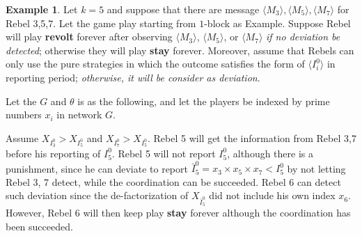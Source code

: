 \documentclass[12pt,letter]{article}
\theoremstyle{definition}
\newtheorem{example}{Example}[section]
\theoremstyle{remark}
\theoremstyle{claim}
\begin{document}
\begin{example}\label{ex_deviation}
Let $k=5$ and suppose that there are message $\langle M_3 \rangle,\langle M_5 \rangle, \langle M_7 \rangle$ for Rebel 3,5,7. Let the game play starting from $1$-block as Example. Suppose Rebel will play \textbf{revolt} forever after observing $\langle M_3 \rangle$, $\langle M_5 \rangle$, or $\langle M_7 \rangle$ \textit{if no deviation be detected}; otherwise they will play \textbf{stay} forever. Moreover, assume that Rebels can only use the pure strategies in which the outcome satisfies the form of $\langle I^0_i \rangle$ in reporting period; \textit{otherwise, it  will be consider as deviation}. 

Let the $G$ and $\theta$ is as the following, and let the players be indexed by prime numbers $x_i$ in network $G$.

\begin{center}


\end{center}



\begin{center}
\end{center}

Assume $X_{I^0_3}>X_{I^0_5}$ and $X_{I^0_7}>X_{I^0_5}$. Rebel 5 will get the information from Rebel 3,7 before his reporting of $I^0_5$. Rebel 5 will not report $I^0_5$, although there is a punishment, since he can deviate to report $\bar{I}^0_5=x_3\times x_5\times x_7<I^0_5$ by not letting Rebel 3, 7 detect, while the coordination can be succeeded. Rebel 6 can detect such deviation since the de-factorization of $X_{\bar{I}^0_5}$ did not include his own index $x_6$. However, Rebel 6 will then keep play \textbf{stay} forever although the coordination has been succeeded.

\end{example}
\end{document}
